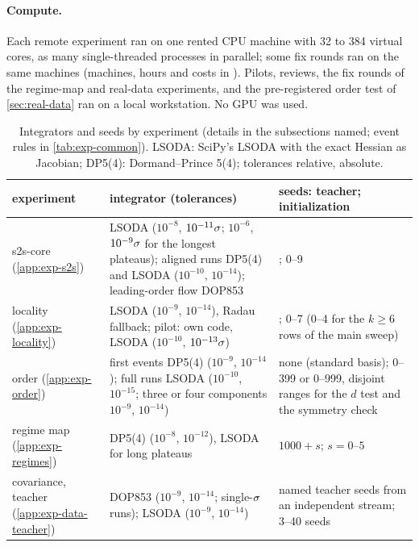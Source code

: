 \paragraph{Compute.}
Each remote experiment ran on one rented CPU machine with 32 to 384 virtual cores, as many
single-threaded processes in parallel; some fix rounds ran on the same machines (machines, hours and
costs in ). Pilots, reviews, the fix rounds of the regime-map and real-data
experiments, and the pre-registered order test of \cref{sec:real-data} ran on a local workstation. No GPU
was used.

\begin{table}[ht]
  \centering
  \caption{Integrators and seeds by experiment (details in the subsections named; event rules in
    \cref{tab:exp-common}). LSODA: SciPy's LSODA with the exact Hessian as Jacobian; DP5(4): Dormand--Prince
    5(4); tolerances relative, absolute.}
  \label{tab:exp-integrators}
  \footnotesize
  \setlength{\tabcolsep}{3pt}
  \begin{tabularx}{\textwidth}{@{}>{\raggedright\arraybackslash}p{2.6cm}>{\raggedright\arraybackslash}X
      >{\raggedright\arraybackslash}p{4.4cm}@{}}
    \toprule
    experiment & integrator (tolerances) & seeds: teacher; initialization \\
    \midrule
    s2s-core (\ref{app:exp-s2s}) & LSODA ($10^{-8}$, $10^{-11}\sigma$; $10^{-6}$, $10^{-9}\sigma$ for the longest
      plateaus); aligned runs DP5(4) and LSODA ($10^{-10}$, $10^{-14}$); leading-order flow DOP853 & 1000; 0--9 \\
    locality (\ref{app:exp-locality}) & LSODA ($10^{-9}$, $10^{-14}$), Radau fallback; pilot: own code,
      LSODA ($10^{-10}$, $10^{-13}\sigma$) & 1000; 0--7 (0--4 for the $k\ge6$ rows of the main sweep) \\
    order (\ref{app:exp-order}) & first events DP5(4) ($10^{-9}$, $10^{-14}$); full runs LSODA ($10^{-10}$,
      $10^{-15}$; three or four components $10^{-9}$, $10^{-14}$) & none (standard basis); 0--399 or 0--999, disjoint
      ranges for the $d$ test and the symmetry check \\
    regime map (\ref{app:exp-regimes}) & DP5(4) ($10^{-8}$, $10^{-12}$), LSODA for long plateaus & $1000+s$; $s=0$--$5$ \\
    covariance, teacher (\ref{app:exp-data-teacher}) & DOP853 ($10^{-9}$, $10^{-14}$; single-$\sigma$
      runs); LSODA ($10^{-9}$, $10^{-14}$) & named teacher seeds from an independent stream; 3--40 seeds \\

\end{tabularx}
\end{table}
